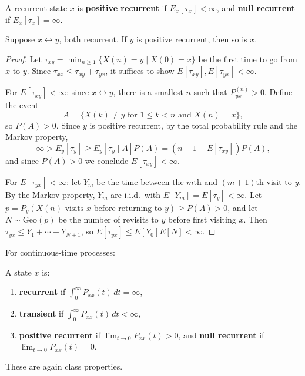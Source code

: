 \documentclass{ximera}
\begin{document}
\begin{definition}
A recurrent state $x$ is \textbf{positive recurrent} if $E_x[\tau_x] < \infty$, and \textbf{null recurrent} if $E_x[\tau_x] = \infty$.
\end{definition}

\begin{theorem}
Suppose $x \leftrightarrow y$, both recurrent. If $y$ is positive recurrent, then so is $x$.
\end{theorem}

\begin{proof}
Let $\tau_{xy} = \min_{n \geq 1}\{X(n) = y \mid X(0) = x\}$ be the first time to go from $x$ to $y$. Since $\tau_{xx} \leq \tau_{xy} + \tau_{yx}$, it suffices to show $E[\tau_{xy}], E[\tau_{yx}] < \infty$.

For $E[\tau_{xy}] < \infty$: since $x \leftrightarrow y$, there is a smallest $n$ such that $P^{(n)}_{yx} > 0$. Define the event
\[
A = \{X(k) \neq y \text{ for } 1 \leq k < n \text{ and } X(n) = x\},
\]
so $P(A) > 0$. Since $y$ is positive recurrent, by the total probability rule and the Markov property,
\[
\infty > E_y[\tau_y] \geq E_y[\tau_y \mid A] P(A) = (n - 1 + E[\tau_{xy}]) P(A),
\]
and since $P(A) > 0$ we conclude $E[\tau_{xy}] < \infty$.

For $E[\tau_{yx}] < \infty$: let $Y_m$ be the time between the $m$th and $(m+1)$th visit to $y$. By the Markov property, $Y_m$ are i.i.d.\ with $E[Y_m] = E[\tau_y] < \infty$. Let $p = P_y(X(n) \text{ visits } x \text{ before returning to } y) \geq P(A) > 0$, and let $N \sim \text{Geo}(p)$ be the number of revisits to $y$ before first visiting $x$. Then $\tau_{yx} \leq Y_1 + \cdots + Y_{N+1}$, so $E[\tau_{yx}] \leq E[Y_0] E[N] < \infty$.
\end{proof}

For continuous-time processes:

\begin{definition}
A state $x$ is:
\begin{enumerate}[label=(\alph*)]
\item \textbf{recurrent} if $\displaystyle\int_0^{\infty} P_{xx}(t)\, dt = \infty$,
\item \textbf{transient} if $\displaystyle\int_0^{\infty} P_{xx}(t)\, dt < \infty$,
\item \textbf{positive recurrent} if $\lim_{t \to 0} P_{xx}(t) > 0$, and \textbf{null recurrent} if $\lim_{t \to 0} P_{xx}(t) = 0$.
\end{enumerate}
These are again class properties.
\end{definition}
\end{document}
